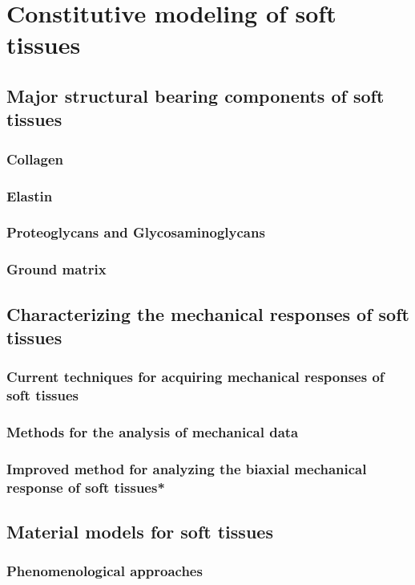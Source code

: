 \chapter{Constitutive modeling of soft tissues}

\section{Major structural bearing components of soft tissues}
\subsection{Collagen}
\subsection{Elastin}
\subsection{Proteoglycans and Glycosaminoglycans}
\subsection{Ground matrix}

\section{Characterizing the mechanical responses of soft tissues}
\subsection{Current techniques for acquiring mechanical responses of soft tissues}
\subsection{Methods for the analysis of mechanical data}
\subsection{Improved method for analyzing the biaxial mechanical response of soft tissues*}

\section{Material models for soft tissues}
\subsection{Phenomenological approaches}
